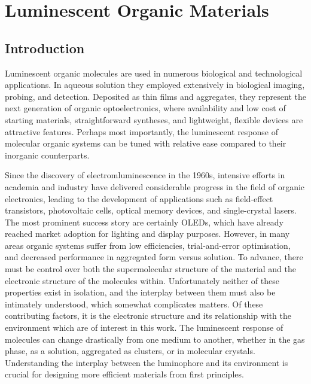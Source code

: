\chapter{Luminescent Organic Materials}
\label{chapter: luminscent organic materials}
\section{Introduction}\label{section: lom introduction}
Luminescent organic molecules are used in numerous biological and technological applications. In aqueous solution they employed extensively in biological imaging, probing, and detection. Deposited as thin films and aggregates, they represent the next generation of organic optoelectronics, where availability and low cost of starting materials, straightforward syntheses, and lightweight, flexible devices are attractive features. Perhaps most importantly, the luminescent response of molecular organic systems can be tuned with relative ease compared to their inorganic counterparts.

Since the discovery of electromluminescence in the 1960s, intensive efforts in academia and industry have delivered considerable progress in the field of organic electronics, leading to  the development of applications such as field-effect transistors, photovoltaic cells, optical memory devices, and single-crystal lasers.\cite{Ostroverkhova2016} The most prominent success story are certainly \acp{OLED}, which have already reached market adoption for lighting and display purposes. However, in many areas organic systems suffer from low efficiencies, trial-and-error optimisation, and decreased performance in aggregated form versus solution. 
To advance, there must be control over both the supermolecular structure of the material and the electronic structure of the  molecules within. Unfortunately neither of these properties exist in isolation, and the interplay between them must also be intimately understood, which somewhat complicates matters. Of these contributing factors, it is the electronic structure and its relationship with the environment which are of interest in this work. The luminescent response of molecules can change drastically from one medium to another, whether in the gas phase, as a solution, aggregated as clusters, or in molecular crystals. Understanding the interplay between the luminophore and its environment is crucial for designing more efficient materials from first principles. 

